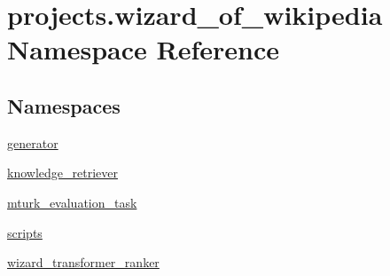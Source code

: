 \hypertarget{namespaceprojects_1_1wizard__of__wikipedia}{}\section{projects.\+wizard\+\_\+of\+\_\+wikipedia Namespace Reference}
\label{namespaceprojects_1_1wizard__of__wikipedia}
\subsection*{Namespaces}
\begin{DoxyCompactItemize}
\item 
 \hyperlink{namespaceprojects_1_1wizard__of__wikipedia_1_1generator}{generator}
\item 
 \hyperlink{namespaceprojects_1_1wizard__of__wikipedia_1_1knowledge__retriever}{knowledge\+\_\+retriever}
\item 
 \hyperlink{namespaceprojects_1_1wizard__of__wikipedia_1_1mturk__evaluation__task}{mturk\+\_\+evaluation\+\_\+task}
\item 
 \hyperlink{namespaceprojects_1_1wizard__of__wikipedia_1_1scripts}{scripts}
\item 
 \hyperlink{namespaceprojects_1_1wizard__of__wikipedia_1_1wizard__transformer__ranker}{wizard\+\_\+transformer\+\_\+ranker}
\end{DoxyCompactItemize}
